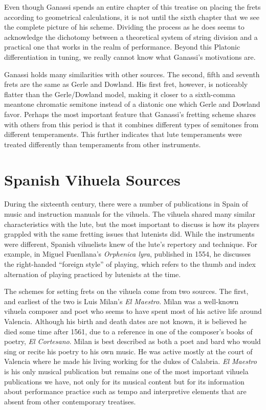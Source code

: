 Even though Ganassi spends an entire chapter of this treatise on placing the frets
according to geometrical calculations, it is not until the sixth chapter that we see
the complete picture of his scheme.  Dividing the process as he does seems to
acknowledge the dichotomy between a theoretical system of string division and a
practical one that works in the realm of performance.  Beyond this Platonic
differentiation in tuning, we really cannot know what Ganassi's motivations are.

Ganassi holds many similarities with other sources.  The second, fifth and seventh
frets are the same as Gerle and Dowland.  His first fret, however, is noticeably
flatter than the Gerle/Dowland model, making it closer to a sixth-comma meantone
chromatic semitone instead of a diatonic one which Gerle and Dowland favor. Perhaps the
most important feature that Ganassi's fretting scheme shares with others from this
period is that it combines different types of semitones from different temperaments.  This
further indicates that lute temperaments were treated differently than temperaments from
other instruments.

\section{Spanish Vihuela Sources}

During the sixteenth century, there were a number of publications in Spain of music
and instruction manuals for the vihuela.  The vihuela shared many similar characteristics with
the lute, but the most important to discuss is how its players grappled with the same
fretting issues that lutenists did. While the instruments were different, Spanish
vihuelists knew of the lute's repertory and technique.  For example, in Miguel
Fuenllana's \textit{Orphenica lyra}, published in 1554, he discusses the right-handed
``foreign style'' of playing, which refers to the thumb and index alternation of
playing practiced by lutenists at the time.

The schemes for setting frets on the vihuela come from two sources. The first, and
earliest of the two is Luis Milan's \textit{El Maestro}.  Milan was a well-known vihuela
composer and poet who seems to have spent most of his active life around Valencia.
Although his birth and death dates are not known, it is believed he died some time
after 1561, due to a reference in one of the composer's books of poetry, \textit{El
Cortesano}.\autocite[6]{LG:1}  Milan is best described as both a poet and bard who
would sing or recite his poetry to his own music.  He was active mostly at the court of
Valencia where he made his living working for the dukes of Calabria. \textit{El
Maestro} is his only musical publication but remains one of the most important vihuela
publications we have, not only for its musical content but for its information about
performance practice such as tempo and interpretive elements that are absent from
other contemporary treatises.

